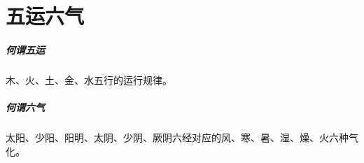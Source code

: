 \chapter{五运六气}

\paragraph{何谓五运}
木、火、土、金、水五行的运行规律。

\paragraph{何谓六气}
太阳、少阳、阳明、太阴、少阴、厥阴六经对应的风、寒、暑、湿、燥、火六种气化。
